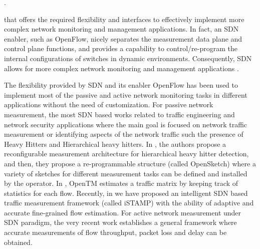  \cite{IF14iSTAMP:2014} \cite{YLiao:2011} \cite{MYu:2011} \cite{MYu:2013}.

that offers the required flexibility and interfaces to effectively implement more complex network monitoring and management applications. In fact, an SDN enabler, such as OpenFlow, nicely separates the measurement data plane and control plane functions, and provides a capability to control/re-program the internal configurations of switches in dynamic environments. Consequently, SDN allows for more complex network monitoring and management applications \cite{IF14iSTAMP:2014} \cite{YLiao:2011} \cite{MYu:2011} \cite{MYu:2013}. %



The flexibility provided by SDN and its enabler OpenFlow has been used to implement most of the passive and active network monitoring tasks in different applications without the need of customization. For passive network measurement, the most SDN based works related to traffic engineering and network security applications where the main goal is focused on network traffic measurement or identifying aspects of the network traffic such the presence of Heavy Hitters and Hierarchical heavy hitters. In \cite{MYu:2011}, the authors propose a reconfigurable measurement architecture for hierarchical heavy hitter detection, and then, \cite{MYu:2013} they propose a re-programmable structure (called OpenSketch) where a variety of sketches for different measurement tasks can be defined and installed by the operator. In \cite{Tootoonchian:2010}, OpenTM estimates a traffic matrix by keeping track of statistics for each flow. Recently, in \cite{IF14iSTAMP:2014} we have proposed an intelligent SDN based traffic measurement framework (called iSTAMP) with the ability of adaptive and accurate fine-grained flow estimation. For active network measurement under SDN paradigm, the very recent work \cite{Adrichen:2014} establishes a general framework where accurate measurements of flow throughput, packet loss and delay can be obtained.
